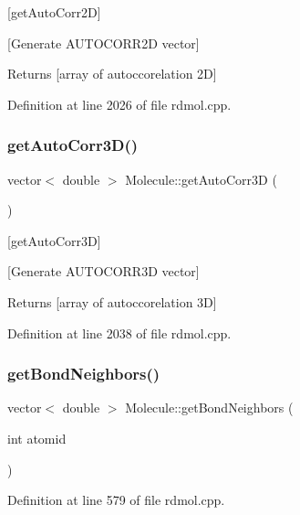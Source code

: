 \mbox{[}get\+Auto\+Corr2D\mbox{]} 

\mbox{[}Generate A\+U\+T\+O\+C\+O\+R\+R2D vector\mbox{]} \begin{DoxyReturn}{Returns}
\mbox{[}array of autoccorelation 2D\mbox{]} 
\end{DoxyReturn}


Definition at line 2026 of file rdmol.\+cpp.

\mbox{\label{class_molecule_a76432450fc78f8e42f7202d58a9b0d09}} 
\subsubsection{\texorpdfstring{get\+Auto\+Corr3\+D()}{getAutoCorr3D()}}
{\footnotesize\ttfamily vector$<$ double $>$ Molecule\+::get\+Auto\+Corr3D (\begin{DoxyParamCaption}{ }\end{DoxyParamCaption})}



\mbox{[}get\+Auto\+Corr3D\mbox{]} 

\mbox{[}Generate A\+U\+T\+O\+C\+O\+R\+R3D vector\mbox{]} \begin{DoxyReturn}{Returns}
\mbox{[}array of autoccorelation 3D\mbox{]} 
\end{DoxyReturn}


Definition at line 2038 of file rdmol.\+cpp.

\mbox{\label{class_molecule_a8b75895f9b9d0c50fa856b0d5289bf5f}} 
\subsubsection{\texorpdfstring{get\+Bond\+Neighbors()}{getBondNeighbors()}}
{\footnotesize\ttfamily vector$<$ double $>$ Molecule\+::get\+Bond\+Neighbors (\begin{DoxyParamCaption}\item[{int}]{atomid }\end{DoxyParamCaption})}



Definition at line 579 of file rdmol.\+cpp.

\mbox{\label{class_molecule_ad58d85938153a73ee5f17426474e6a90}} 
